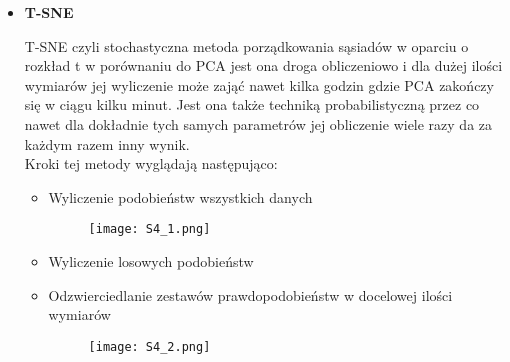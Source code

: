\begin{itemize}
	\item \textbf{T-SNE}
	
	T-SNE czyli stochastyczna metoda porządkowania sąsiadów w oparciu o rozkład t w porównaniu do PCA jest ona droga obliczeniowo i dla dużej ilości wymiarów jej wyliczenie może zająć nawet kilka godzin gdzie PCA zakończy się w ciągu kilku minut. Jest ona także techniką probabilistyczną przez co nawet dla dokładnie tych samych parametrów jej obliczenie wiele razy da za każdym razem inny wynik. \\
	
	Kroki tej metody wyglądają następująco:
	\begin{itemize}
		\item Wyliczenie podobieństw wszystkich danych
			\begin{figure}[H]
				\centering
				\texttt{[image: S4\_1.png]}
			\end{figure}
		\item Wyliczenie losowych podobieństw
		\item Odzwierciedlanie zestawów prawdopodobieństw w docelowej ilości wymiarów
			\begin{figure}[H]
				\centering
				\texttt{[image: S4\_2.png]}
			\end{figure}
	\end{itemize}
	
	
\end{itemize}

